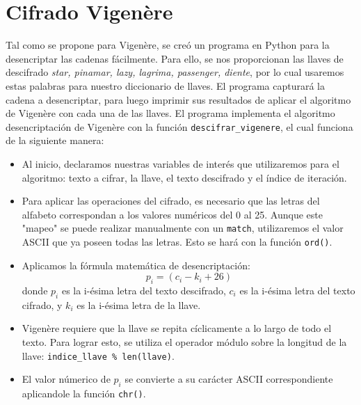\section{Cifrado Vigenère}
Tal como se propone para Vigenère, se creó un programa en Python para la desencriptar las cadenas fácilmente. Para ello, se nos proporcionan las llaves de descifrado \textit{star, pinamar, lazy, lagrima, passenger, diente}, por lo cual usaremos estas palabras para nuestro diccionario de llaves. El programa capturará la cadena a desencriptar, para luego imprimir sus resultados de aplicar el algoritmo de Vigenère con cada una de las llaves.
El programa implementa el algoritmo desencriptación de Vigenère con la función \texttt{descifrar\_vigenere}, el cual funciona de la siguiente manera:
\begin{itemize}
	\item Al inicio, declaramos nuestras variables de interés que utilizaremos para el algoritmo: texto a cifrar, la llave, el texto descifrado y el índice de iteración.
	\item Para aplicar las operaciones del cifrado, es necesario que las letras del alfabeto correspondan a los valores numéricos del 0 al 25. Aunque este "mapeo" se puede realizar manualmente con un \texttt{match}, utilizaremos el valor ASCII que ya poseen todas las letras. Esto se hará con la función \texttt{ord()}.
	\item Aplicamos la fórmula matemática de desencriptación:
	\begin{equation}
		p_i = (c_i - k_i + 26) %
	\end{equation}
	donde $p_i$ es la i-ésima letra del texto descifrado, $c_i$ es la i-ésima letra del texto cifrado, y $k_i$ es la i-ésima letra de la llave.
	\item Vigenère requiere que la llave se repita cíclicamente a lo largo de todo el texto. Para lograr esto, se utiliza el operador módulo sobre la longitud de la llave: \texttt{indice\_llave \% len(llave)}.
	\item El valor númerico de $p_i$ se convierte a su carácter ASCII correspondiente aplicandole la función \texttt{chr()}.
\end{itemize}
